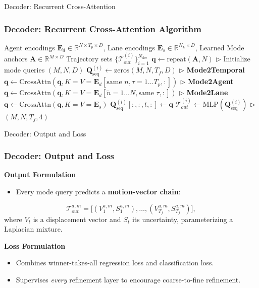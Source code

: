 \documentclass[10pt,aspectratio=169]{beamer}
\begin{document}
\begin{frame}[fragile]{Decoder: Recurrent Cross-Attention}
    \frametitle{Decoder: Recurrent Cross-Attention Algorithm}
    \begin{algorithm}[H]
    \caption{LMFormer Recurrent Cross-Attention Decoder}
    \label{alg:lmformer_decoder}
    \begin{algorithmic}[1]
    \scriptsize
    \Require Agent encodings \(\mathbf{E}_d \in \mathbb{R}^{N \times T_{p} \times D}\), Lane encodings \(\mathbf{E}_s \in \mathbb{R}^{N_L \times D}\), Learned Mode anchors \(\mathbf{A} \in \mathbb{R}^{M \times D}\)
    \Ensure Trajectory sets \(\{\mathcal{T}_{out}^{(i)}\}_{i=1}^{N_{\text{dec}}}\)
    \State \(\mathbf{q} \leftarrow \text{repeat}(\mathbf{A}, N)\) \(\triangleright\) Initialize mode queries \((M, N, D)\)
        \State \(\mathbf{Q}_{\text{seq}}^{(i)} \leftarrow \text{zeros}(M, N, T_f, D)\)
            \State \(\triangleright\) \textbf{Mode2Temporal}
            \State \(\mathbf{q}\leftarrow \text{CrossAttn}(\mathbf{q}, K=V=\mathbf{E}_d[\text{same } n, \tau=1\dots T_p, :])\)
            \State \(\triangleright\) \textbf{Mode2Agent}
            \State \(\mathbf{q}\leftarrow \text{CrossAttn}(\mathbf{q}, K=V=\mathbf{E}_d[\tilde{n}=1\dots N, \text{same }\tau, :])\)
            \State \(\triangleright\) \textbf{Mode2Lane}
            \State \(\mathbf{q}\leftarrow \text{CrossAttn}(\mathbf{q}, K=V=\mathbf{E}_s)\)
            \State \(\mathbf{Q}_{\text{seq}}^{(i)}[:,:,t,:] \leftarrow \mathbf{q}\)
        \EndFor
        \State \(\mathcal{T}_{out}^{(i)} \leftarrow \text{MLP}(\mathbf{Q}_{\text{seq}}^{(i)})\) \(\triangleright\) \((M, N, T_f, 4)\)
    \EndFor
    \end{algorithmic}
    \end{algorithm}


\end{frame}

\begin{frame}{Decoder: Output and Loss}
    \frametitle{Decoder: Output and Loss}
    \textbf{Output Formulation}
    \begin{itemize}
        \item Every mode query predicts a \textbf{motion-vector chain}:
    \end{itemize}
    \begin{equation}
    \mathcal{T}_{out}^{a,m} = \bigl[(V_1^{a,m},S_1^{a,m}),\dots,(V_{T_f}^{a,m},S_{T_f}^{a,m})\bigr],
    \end{equation}
    where \(V_t\) is a displacement vector and \(S_t\) its uncertainty, parameterizing a Laplacian mixture.

    \vspace{1em}
    \textbf{Loss Formulation}
    \begin{itemize}
        \item Combines winner-takes-all regression loss and classification loss.
        \item Supervises \emph{every} refinement layer to encourage coarse-to-fine refinement.
    \end{itemize}
\end{frame}
\end{document}
